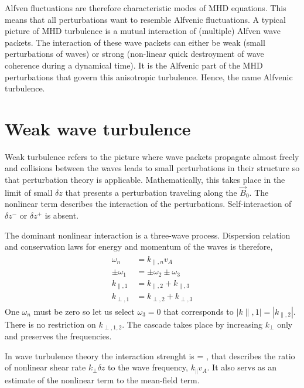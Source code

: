\documentclass[usenatbib,twocolumn]{aastex63}
\begin{document}
Alfven fluctuations are therefore characteristic modes of MHD equations.
This means that all perturbations want to resemble Alfvenic fluctuations.
A typical picture of MHD turbulence is a mutual interaction of (multiple) Alfven wave packets.
The interaction of these wave packets can either be weak (small perturbations of waves) or strong (non-linear quick destroyment of wave coherence during a dynamical time).
It is the Alfvenic part of the MHD perturbations that govern this anisotropic turbulence. 
Hence, the name Alfvenic turbulence.


\section{Weak wave turbulence}

Weak turbulence refers to the picture where wave packets propagate almost freely and collisions between the waves leads to small perturbations in their structure so that perturbation theory is applicable.
Mathematically, this takes place in the limit of small $\delta z$ that presents a perturbation traveling along the $\vec{B}_0$.
The nonlinear term describes the interaction of the perturbations.
Self-interaction of $\delta z^-$ or $\delta z^+$ is absent.

The dominant nonlinear interaction is a three-wave process.
Dispersion relation and conservation laws for energy and momentum of the waves is therefore,
\begin{align}\begin{split}
    \omega_n &= k_{\parallel,n} v_A \\
    \pm \omega_1 &= \pm \omega_2 \pm \omega_3 \\
    k_{\parallel,1} &= k_{\parallel,2} + k_{\parallel,3} \\
    k_{\perp,1} &= k_{\perp,2} + k_{\perp,3} 
\end{split}\end{align}
One $\omega_n$ must be zero so let us select $\omega_3=0$ that corresponds to $|k{\parallel,1}| = |k_{\parallel,2}|$.
There is no restriction on $k_{\perp,1,2}$.
The cascade takes place by increasing $k_\perp$ only and preserves the frequencies.

In wave turbulence theory the interaction strenght is
\be
\chi = ,
\ee
that describes the ratio of nonlinear shear rate $k_\perp \delta z$ to the wave frequency, $k_\parallel v_A$.
It also servs as an estimate of the nonlinear term to the mean-field term.
\end{document}
